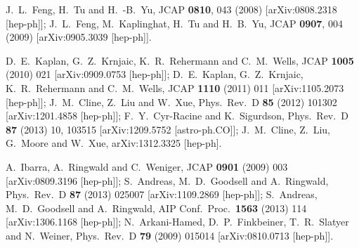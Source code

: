 \documentclass[12pt]{article}
\begin{document}
{{\begin{thebibliography}{999}

  
  
  J.~L.~Feng, H.~Tu and H.~-B.~Yu,
  JCAP {\bf 0810}, 043 (2008)
  [arXiv:0808.2318 [hep-ph]];
  J.~L.~Feng, M.~Kaplinghat, H.~Tu and H.~B.~Yu,
  JCAP {\bf 0907}, 004 (2009)
  [arXiv:0905.3039 [hep-ph]].
  
   D.~E.~Kaplan, G.~Z.~Krnjaic, K.~R.~Rehermann and C.~M.~Wells,
  JCAP {\bf 1005} (2010) 021
  [arXiv:0909.0753 [hep-ph]];
  D.~E.~Kaplan, G.~Z.~Krnjaic, K.~R.~Rehermann and C.~M.~Wells,
  JCAP {\bf 1110} (2011) 011
  [arXiv:1105.2073 [hep-ph]];
  J.~M.~Cline, Z.~Liu and W.~Xue,
  Phys.\ Rev.\ D {\bf 85} (2012) 101302
  [arXiv:1201.4858 [hep-ph]];
  F.~Y.~Cyr-Racine and K.~Sigurdson,
  Phys.\ Rev.\ D {\bf 87} (2013) 10,  103515
  [arXiv:1209.5752 [astro-ph.CO]];
  J.~M.~Cline, Z.~Liu, G.~Moore and W.~Xue,
  arXiv:1312.3325 [hep-ph].
  
  A.~Ibarra, A.~Ringwald and C.~Weniger,
  JCAP {\bf 0901} (2009) 003
  [arXiv:0809.3196 [hep-ph]];
  S.~Andreas, M.~D.~Goodsell and A.~Ringwald,
  Phys.\ Rev.\ D {\bf 87} (2013) 025007
  [arXiv:1109.2869 [hep-ph]];
  S.~Andreas, M.~D.~Goodsell and A.~Ringwald,
  AIP Conf.\ Proc.\  {\bf 1563} (2013) 114
  [arXiv:1306.1168 [hep-ph]];
  N.~Arkani-Hamed, D.~P.~Finkbeiner, T.~R.~Slatyer and N.~Weiner,
  Phys.\ Rev.\ D {\bf 79} (2009) 015014
  [arXiv:0810.0713 [hep-ph]].
  

\end{thebibliography}}}
\end{document}
